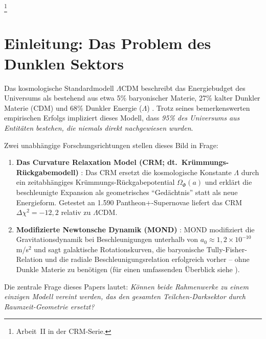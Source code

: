 \documentclass[aps,prd,twocolumn,superscriptaddress,nofootinbib]{revtex4-2}
\begin{document}
\thanks{Arbeit~II in der CRM-Serie.}

\maketitle


\section{Einleitung: Das Problem des Dunklen Sektors}
\label{sec:intro}

Das kosmologische Standardmodell $\Lambda$CDM beschreibt das Energiebudget des Universums als bestehend aus etwa 5\% baryonischer Materie, 27\% kalter Dunkler Materie (CDM) und 68\% Dunkler Energie ($\Lambda$) \cite{Planck2020}. Trotz seines bemerkenswerten empirischen Erfolgs impliziert dieses Modell, dass \textit{95\% des Universums aus Entit\"aten bestehen, die niemals direkt nachgewiesen wurden}.

Zwei unabh\"angige Forschungsrichtungen stellen dieses Bild in Frage:

\begin{enumerate}
\item \textbf{Das Curvature Relaxation Model (CRM; dt.\ Kr\"ummungs-R\"uckgabemodell)} \cite{Geiger2026}: Das CRM ersetzt die kosmologische Konstante $\Lambda$ durch ein zeitabh\"angiges Kr\"ummungs-R\"uckgabepotential $\Omega_\Phi(a)$ und erkl\"art die beschleunigte Expansion als geometrisches "`Ged\"achtnis"' statt als neue Energieform. Getestet an 1.590 Pantheon+-Supernovae liefert das CRM $\Delta\chi^2 = -12{,}2$ relativ zu $\Lambda$CDM.

\item \textbf{Modifizierte Newtonsche Dynamik (MOND)} \cite{Milgrom1983}: MOND modifiziert die Gravitationsdynamik bei Beschleunigungen unterhalb von $a_0 \approx 1{,}2 \times 10^{-10}$\,m/s$^2$ und sagt galaktische Rotationskurven, die baryonische Tully-Fisher-Relation \cite{McGaugh2016} und die radiale Beschleunigungsrelation \cite{Lelli2017} erfolgreich vorher -- ohne Dunkle Materie zu ben\"otigen (f\"ur einen umfassenden \"Uberblick siehe \cite{FamaeyMcGaugh2012}).
\end{enumerate}

Die zentrale Frage dieses Papers lautet: \textit{K\"onnen beide Rahmenwerke zu einem einzigen Modell vereint werden, das den gesamten Teilchen-Darksektor durch Raumzeit-Geometrie ersetzt?}
\end{document}
